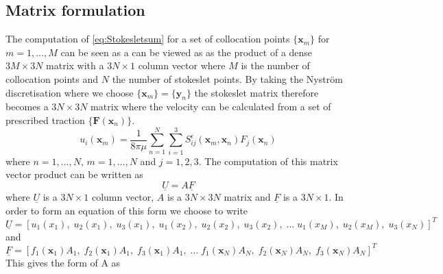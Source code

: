 \subsection{Matrix formulation}
The computation of \cref{eq:Stokesletsum} for a set of collocation points $\{\bm{x}_m\}$  for $m = 1,...,M$ can be seen as a 
can be viewed as as the product of a dense $3M \times 3N$ matrix with a $3N \times 1$ column vector where $M$ is the number of collocation points and $N$ the number of stokeslet points. By taking the Nyström discretisation where we choose $\{\bm{x}_m\} = \{\bm{y}_n\}$ the stokeslet matrix therefore becomes a $3N \times 3N$ matrix where the velocity can be calculated from a set of prescribed traction $\{\bm{F}(\bm{x}_n)\}$. 
\begin{equation}
\label{eq:Nystrom}
    u_{i}\left(\bm{x}_m\right)=\frac{1}{8 \pi \mu} \sum_{n=1}^{N} \sum_{i=1}^{3} S_{i j}^{\epsilon}\left(\bm{x}_m, {\bm{x}}_{n}\right) {F}_{j}({\bm{x}}_{n})
\end{equation}
where $n=1,\dots,N$, $m=1,\dots,N$ and $j=1,2,3$. The computation of this matrix vector product can be written as 
\begin{equation}
\label{eq:matrixvectorproduct}
    \underline{U} = A \underline{F}
\end{equation}
where $\underline{U}$ is a $3N \times 1$ column vector, $A$ is a $3N \times 3N$ matrix and $\underline{F}$ is a $3N \times 1$. In order to form an equation of this form we choose to write 
\small
\begin{equation*}
    \underline{U} = [u_1(x_{1}), \; u_2(x_{1}), \; u_3(x_{1}), \; u_1(x_{2}), \; u_2(x_{2}), \; u_3(x_{2}), \; \dots \; u_1(x_{M}), \; u_2(x_{M}), \; u_3(x_{N})]^{T}
\end{equation*}
\normalsize
and 
\small
\begin{equation*}
    \underline{F} = [{f}_{1}({\bm{x}}_{1})A_1, \; {f}_{2}({\bm{x}}_{1})A_1, \; {f}_{3}({\bm{x}}_{1})A_1,\; \dots \; {f}_{1}({\bm{x}}_{N})A_N, \; {f}_{2}({\bm{x}}_{N})A_N, \; f_{3}({\bm{x}}_{N})A_N]^{T}
\end{equation*}
\normalsize
This gives the form of A as 
\small
